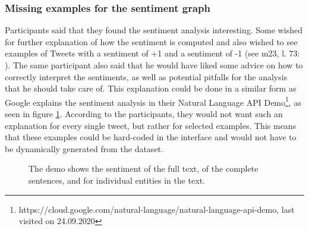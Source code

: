 \subsubsection*{Missing examples for the sentiment graph}\label{sec:missingExamples}
Participants said that they found the sentiment analysis interesting. Some wished for further explanation of how the sentiment is computed and also wished to see examples of Tweets with a sentiment of +1 and a sentiment of -1 (see m23, l. 73: ).
The same participant also said that he would have liked some advice on how to correctly interpret the sentiments, as well as potential pitfalls for the analysis that he should take care of. This explanation could be done in a similar form as Google explains the sentiment analysis in their Natural Language API Demo\footnote{https://cloud.google.com/natural-language/natural-language-api-demo, last visited on 24.09.2020}, as seen in figure \ref{fig:sentiment_google}. According to the participants, they would not want such an explanation for every single tweet, but rather for selected examples. This means that these examples could be hard-coded in the interface and would not have to be dynamically generated from the dataset.

\begin{figure}[htbp]
    \caption{The demo shows the sentiment of the full text, of the complete sentences, and for individual entities in the text.}
    \label{fig:sentiment_google}
\end{figure}

